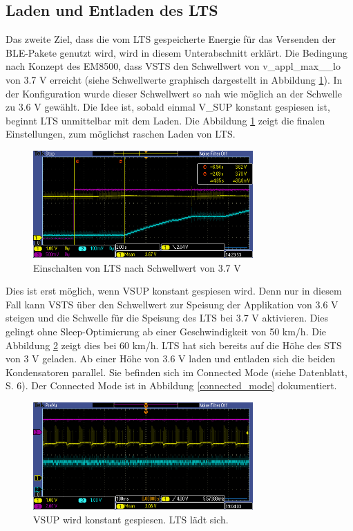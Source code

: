 \subsection{Laden und Entladen des LTS}
\label{res_entladen}

Das zweite Ziel, dass die vom LTS gespeicherte Energie für das Versenden der BLE-Pakete genutzt wird, wird in diesem Unterabschnitt erklärt. Die Bedingung nach Konzept des EM8500, dass VSTS den Schwellwert von v\_appl\_max\_\_lo von 3.7 V erreicht (siehe Schwellwerte graphisch dargestellt in Abbildung \ref{lts_ein}). In der Konfiguration wurde dieser Schwellwert so nah wie möglich an der Schwelle zu 3.6 V gewählt. Die Idee ist, sobald einmal V\_SUP konstant gespiesen ist, beginnt LTS unmittelbar mit dem Laden. Die Abbildung \ref{lts_ein} zeigt die finalen Einstellungen, zum  möglichst raschen Laden von LTS.

\begin{figure}[ht]
   \includegraphics[width=0.75\textwidth]{4Resultate/imag/LTS_Ladeschwelle.PNG}
    \caption{Einschalten von LTS nach Schwellwert von 3.7 V}
    \label{lts_ein}
\end{figure}

\begin{minipage}{1\textwidth}
Dies ist erst möglich, wenn VSUP konstant gespiesen wird. Denn nur in diesem Fall kann VSTS über den Schwellwert zur Speisung der Applikation von 3.6 V steigen und die Schwelle für die Speisung des LTS bei 3.7 V aktivieren. Dies gelingt ohne Sleep-Optimierung ab einer Geschwindigkeit von 50 km/h. Die Abbildung \ref{vsup_konstant} zeigt dies bei 60 km/h. LTS hat sich bereits auf die Höhe des STS von 3 V geladen. Ab einer Höhe von 3.6 V laden und entladen sich die beiden Kondensatoren parallel. Sie befinden sich im Connected Mode (siehe Datenblatt,  S. 6). Der Connected Mode ist in Abbildung \ref{connected_mode} dokumentiert.
\end{minipage}

\begin{figure}[ht]
   \includegraphics[width=0.75\textwidth]{4Resultate/imag/pic_5.PNG}
    \caption{VSUP wird konstant gespiesen. LTS lädt sich.}
    \label{vsup_konstant}
\end{figure}

